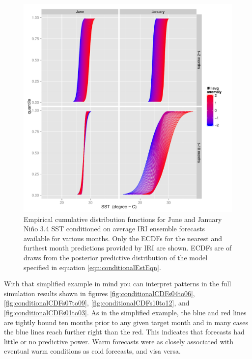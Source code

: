 \documentclass[authoryear]{article}
\begin{document}
\begin{figure}[!htbp]
  \includegraphics[width=\linewidth]{Pricingfigs/conditionalCDFsIllustrativeExamplesTradConfigFull}
  \caption{Empirical cumulative distribution functions for June and January Ni\~no 3.4 SST conditioned on average IRI ensemble forecasts available for various months. Only the ECDFs for the nearest and furthest month predictions provided by IRI are shown. ECDFs are of draws from the posterior predictive distribution of the model specified in equation \ref{eqn:conditionalEstEqn}.}
   \label{fig:conditionalCDFsIllustrativeExamplesTradConfigFull}
\end{figure}




With that simplified example in mind you can interpret patterns in the full simulation results shown in figures \ref{fig:conditionalCDFs04to06}, \ref{fig:conditionalCDFs07to09}, \ref{fig:conditionalCDFs10to12}, and \ref{fig:conditionalCDFs01to03}. As in the simplified example, the blue and red lines are tightly bound ten months prior to any given target month and in many cases the blue lines reach further right than the red. This indicates that forecasts had little or no predictive power. Warm forecasts were as closely associated with eventual warm conditions as cold forecasts, and visa versa. 
\end{document}
